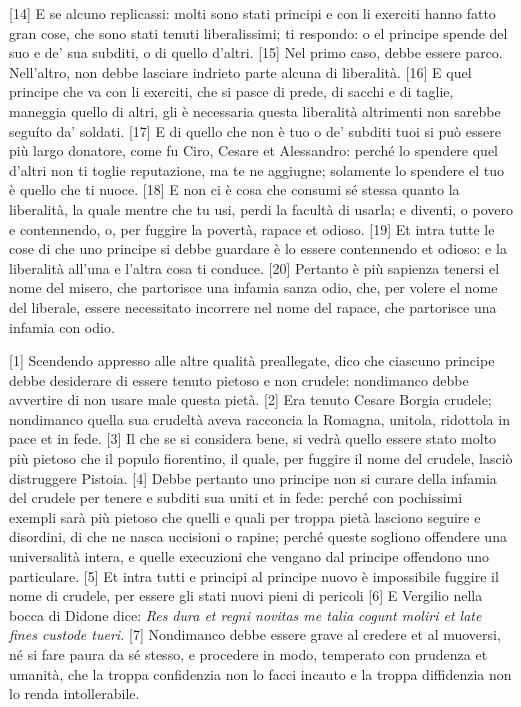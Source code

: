 \pagebreak

{[}14{]} E se alcuno replicassi: molti sono stati principi e con li
exerciti hanno fatto gran cose, che sono stati tenuti liberalissimi; ti
respondo: o el principe spende del suo e de' sua subditi, o di quello
d'altri. {[}15{]} Nel primo caso, debbe essere parco. Nell'altro, non
debbe lasciare indrieto parte alcuna di liberalità. {[}16{]} E quel
principe che va con li exerciti, che si pasce di prede, di sacchi e di
taglie, maneggia quello di altri, gli è necessaria questa liberalità
altrimenti non sarebbe seguíto da' soldati. {[}17{]} E di quello che non
è tuo o de' subditi tuoi si può essere più largo donatore, come fu Ciro,
Cesare et Alessandro: perché lo spendere quel d'altri non ti toglie
reputazione, ma te ne aggiugne; solamente lo spendere el tuo è quello
che ti nuoce. {[}18{]} E non ci è cosa che consumi sé stessa quanto la
liberalità, la quale mentre che tu usi, perdi la facultà di usarla; e
diventi, o povero e contennendo, o, per fuggire la povertà, rapace et
odioso. {[}19{]} Et intra tutte le cose di che uno principe si debbe
guardare è lo essere contennendo et odioso: e la liberalità all'una e
l'altra cosa ti conduce. {[}20{]} Pertanto è più sapienza tenersi el
nome del misero, che partorisce una infamia sanza odio, che, per volere
el nome del liberale, essere necessitato incorrere nel nome del rapace,
che partorisce una infamia con odio.


{[}1{]} Scendendo appresso alle altre qualità preallegate, dico che
ciascuno principe debbe desiderare di essere tenuto pietoso e non
crudele: nondimanco debbe avvertire di non usare male questa pietà.
{[}2{]} Era tenuto Cesare Borgia crudele; nondimanco quella sua crudeltà
aveva racconcia la Romagna, unitola, ridottola in pace et in fede.
{[}3{]} Il che se si considera bene, si vedrà quello essere stato molto
più pietoso che il populo fiorentino, il quale, per fuggire il nome del
crudele, lasciò distruggere Pistoia. {[}4{]} Debbe pertanto uno principe
non si curare della infamia del crudele per tenere e subditi sua uniti
et in fede: perché con pochissimi exempli sarà più pietoso che quelli e
quali per troppa pietà lasciono seguire e disordini, di che ne nasca
uccisioni o rapine; perché queste sogliono offendere una universalità
intera, e quelle execuzioni che vengano dal principe offendono uno
particulare. {[}5{]} Et intra tutti e principi al principe nuovo è
impossibile fuggire il nome di crudele, per essere gli stati nuovi pieni
di pericoli {[}6{]} E Vergilio nella bocca di Didone dice: \emph{Res
dura et regni novitas me talia cogunt moliri et late fines custode
tueri.} {[}7{]} Nondimanco debbe essere grave al credere et al muoversi,
né si fare paura da sé stesso, e procedere in modo, temperato con
prudenza et umanità, che la troppa confidenzia non lo facci incauto e la
troppa diffidenzia non lo renda intollerabile.

